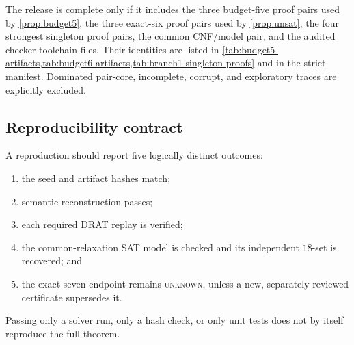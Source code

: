 The release is complete only if it includes the three budget-five proof pairs
used by \cref{prop:budget5}, the three exact-six proof pairs used by
\cref{prop:unsat}, the four strongest singleton proof pairs, the common
CNF/model pair, and the audited checker toolchain files.  Their identities are
listed in
\cref{tab:budget5-artifacts,tab:budget6-artifacts,tab:branch1-singleton-proofs}
and in the strict manifest.  Dominated pair-core,
incomplete, corrupt, and exploratory traces are explicitly excluded.

\subsection{Reproducibility contract}

A reproduction should report five logically distinct outcomes:
\begin{enumerate}[label=(\arabic*)]
\item the seed and artifact hashes match;
\item semantic reconstruction passes;
\item each required DRAT replay is verified;
\item the common-relaxation SAT model is checked and its independent
  \(18\)-set is recovered; and
\item the exact-seven endpoint remains \textsc{unknown}, unless a new,
  separately reviewed certificate supersedes it.
\end{enumerate}
Passing only a solver run, only a hash check, or only unit tests does not by
itself reproduce the full theorem.
